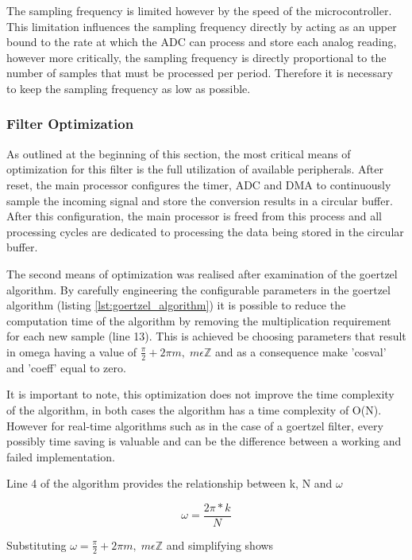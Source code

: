 The sampling frequency is limited however by the speed of the microcontroller. This limitation influences the sampling frequency directly by acting as an upper bound to the rate at which the ADC can process and store each analog reading, however more critically, the sampling frequency is directly proportional to the number of samples that must be processed per period. Therefore it is necessary to keep the sampling frequency as low as possible.

\subsubsection{Filter Optimization}
\label{sec:filter_optimization_design}
As outlined at the beginning of this section, the most critical means of optimization for this filter is the full utilization of available peripherals. After reset, the main processor configures the timer, ADC and DMA to continuously sample the incoming signal and store the conversion results in a circular buffer. After this configuration, the main processor is freed from this process and all processing cycles are dedicated to processing the data being stored in the circular buffer.

The second means of optimization was realised after examination of the goertzel algorithm. By carefully engineering the configurable parameters in the goertzel algorithm (listing \ref{lst:goertzel_algorithm}) it is possible to reduce the computation time of the algorithm by removing the multiplication requirement for each new sample (line 13). This is achieved be choosing parameters that result in omega having a value of \(\frac{\pi}{2} + 2\pi m,\; m\epsilon \mathbb{Z}\) and as a consequence make 'cosval' and 'coeff' equal to zero.

It is important to note, this optimization does not improve the time complexity of the algorithm, in both cases the algorithm has a time complexity of O(N). However for real-time algorithms such as in the case of a goertzel filter, every possibly time saving is valuable and can be the difference between a working and failed implementation.

Line 4 of the algorithm provides the relationship between k, N and $\omega$

\begin{equation}
	\omega = \frac{2\pi * k}{N}
\end{equation}

Substituting \(\omega = \frac{\pi}{2} + 2\pi m,\; m\epsilon \mathbb{Z}\) and simplifying shows

